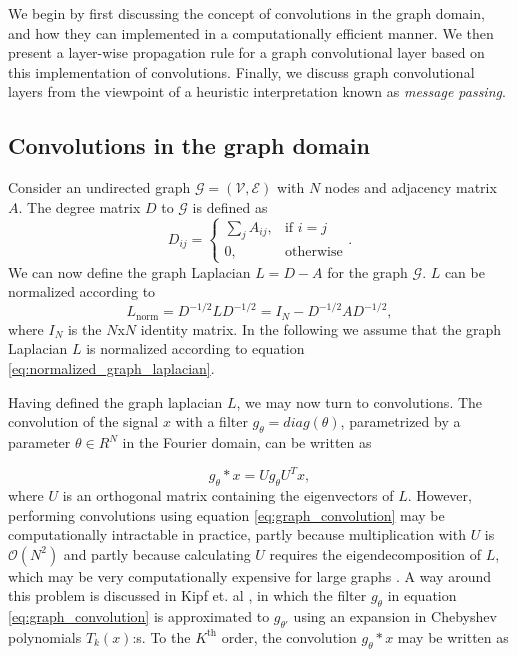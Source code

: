 We begin by first discussing the concept of convolutions in the graph domain, and how they can implemented in a computationally efficient manner. We then present a layer-wise propagation rule for a graph convolutional layer based on this implementation of convolutions. Finally, we discuss graph convolutional layers from the viewpoint of a heuristic interpretation known as \textit{message passing}.

\subsection{Convolutions in the graph domain}

Consider an undirected graph $\mathcal{G} = (\mathcal{V}, \mathcal{E})$ with $N$ nodes and adjacency matrix $A$. The degree matrix $D$ to $\mathcal{G}$ is defined as 
\begin{equation}
    D_{ij} = \begin{cases} \sum_j A_{ij}, & \mbox{if } i = j \\ \mbox{0,} & \mbox{otherwise} \end{cases}.
    \label{eq:degreematrixdefinition}
\end{equation}
We can now define the graph Laplacian $L= D-A $ for the graph $\mathcal{G}$. $L$ can be normalized according to 
\begin{equation}
    L_\text{norm} = D^{-1/2} L D^{-1/2} =  I_N - D^{-1/2} A D^{-1/2},
    \label{eq:normalized_graph_laplacian}
\end{equation}
where $I_N$ is the $N$x$N$ identity matrix. In the following we assume that the graph Laplacian $L$ is normalized according to equation \eqref{eq:normalized_graph_laplacian}.

Having defined the graph laplacian $L$, we may now turn to convolutions. The convolution of the signal $x$ with a filter $g_\theta = diag(\theta)$, parametrized by a parameter $\theta \in R^N$ in the Fourier domain, can be written as 

\begin{equation}
    g_\theta * x = U g_\theta U^T x,
    \label{eq:graph_convolution}
\end{equation}
where $U$ is an orthogonal matrix containing the eigenvectors of $L$. However, performing convolutions using equation \ref{eq:graph_convolution} may be computationally intractable in practice, partly because multiplication with $U$ is $\mathcal{O}(N^2)$ and partly because calculating $U$ requires the eigendecomposition of $L$, which may be very computationally expensive for large graphs \cite{kipf_semi_supervised}. A way around this problem is discussed in Kipf et. al \cite{kipf_semi_supervised}, in which the filter $g_\theta$ in equation \ref{eq:graph_convolution} is approximated to $g_{\theta'}$ using an expansion in Chebyshev polynomials $T_k(x)$:s. To the $K^{\text{th}}$ order, the convolution $g_\theta * x$ may be written as 

